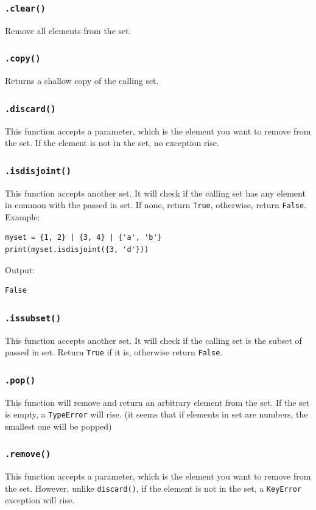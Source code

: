 \documentclass[12pt]{book}
\begin{document}
\subsubsection{\texttt{.clear()}}
\label{sec:org11d811a}
Remove all elements from the set.
\subsubsection{\texttt{.copy()}}
\label{sec:org987077f}
Returns a shallow copy of the calling set.

\subsubsection{\texttt{.discard()}}
\label{sec:org2fbd401}
This function accepts a parameter, which is the element you want to remove from the set. If the element is not in the set, no exception rise.
\subsubsection{\texttt{.isdisjoint()}}
\label{sec:org33e6c9a}
This function accepts another set. It will check if the calling set has any element in common with the passed in set. If none, return \texttt{True}, otherwise, return \texttt{False}. Example:
\begin{verbatim}
myset = {1, 2} | {3, 4} | {'a', 'b'}
print(myset.isdisjoint({3, 'd'}))
\end{verbatim}
Output:
\begin{verbatim}
False
\end{verbatim}
\subsubsection{\texttt{.issubset()}}
\label{sec:org2e5de85}
This function accepts another set. It will check if the calling set is the subset of passed in set. Return \texttt{True} if it is, otherwise return \texttt{False}.
\subsubsection{\texttt{.pop()}}
\label{sec:org4c34882}
This function will remove and return an arbitrary element from the set. If the set is empty, a \texttt{TypeError} will rise. (it seems that if elements in set are numbers, the smallest one will be popped)
\subsubsection{\texttt{.remove()}}
\label{sec:orge419175}
This function accepts a parameter, which is the element you want to remove from the set. However, unlike \texttt{discard()}, if the element is not in the set, a \texttt{KeyError} exception will rise.
\end{document}
